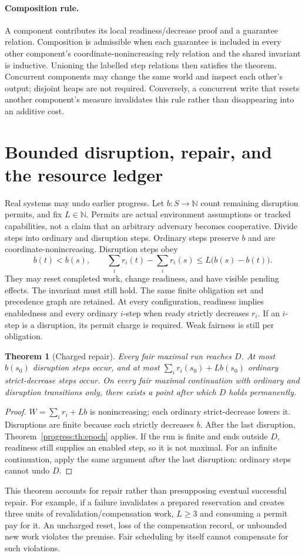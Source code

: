 \documentclass[11pt]{article}
\newtheorem{theorem}{Theorem}[section]
\begin{document}
\paragraph{Composition rule.} A component contributes its local readiness/decrease proof and a guarantee relation. Composition is admissible when each guarantee is included in every other component's coordinate-nonincreasing rely relation and the shared invariant is inductive. Unioning the labelled step relations then satisfies the theorem. Concurrent components may change the same world and inspect each other's output; disjoint heaps are not required. Conversely, a concurrent write that resets another component's measure invalidates this rule rather than disappearing into an additive cost.

\section{Bounded disruption, repair, and the resource ledger}
Real systems may undo earlier progress. Let $b:S\to\mathbb N$ count remaining disruption permits, and fix $L\in\mathbb N$. Permits are actual environment assumptions or tracked capabilities, not a claim that an arbitrary adversary becomes cooperative. Divide steps into ordinary and disruption steps. Ordinary steps preserve $b$ and are coordinate-nonincreasing. Disruption steps obey
\[
 b(t)<b(s),\qquad \sum_i r_i(t)-\sum_i r_i(s)\le L\bigl(b(s)-b(t)\bigr).
\]
They may reset completed work, change readiness, and have visible pending effects. The invariant must still hold. The same finite obligation set and precedence graph are retained. At every configuration, readiness implies enabledness and every ordinary $i$-step when ready strictly decreases $r_i$. If an $i$-step is a disruption, its permit charge is required. Weak fairness is still per obligation.

\begin{theorem}[Charged repair]\label{progress:th:repair}
Every fair maximal run reaches $D$. At most $b(s_0)$ disruption steps occur, and at most $\sum_i r_i(s_0)+L b(s_0)$ ordinary strict-decrease steps occur. On every fair maximal continuation with ordinary and disruption transitions only, there exists a point after which $D$ holds permanently.
\end{theorem}
\begin{proof}
$W=\sum_i r_i+Lb$ is nonincreasing; each ordinary strict-decrease lowers it. Disruptions are finite because each strictly decreases $b$. After the last disruption, Theorem~\ref{progress:th:epoch} applies. If the run is finite and ends outside $D$, readiness still supplies an enabled step, so it is not maximal. For an infinite continuation, apply the same argument after the last disruption: ordinary steps cannot undo $D$.
\end{proof}
This theorem accounts for repair rather than presupposing eventual successful repair. For example, if a failure invalidates a prepared reservation and creates three units of revalidation/compensation work, $L\ge3$ and consuming a permit pay for it. An uncharged reset, loss of the compensation record, or unbounded new work violates the premise. Fair scheduling by itself cannot compensate for such violations.
\end{document}

